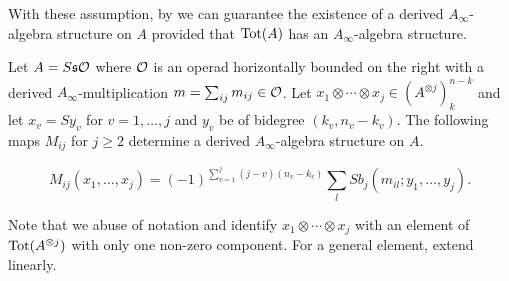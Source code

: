 \documentclass[twoside]{article}
\begin{document}
With these assumption, by  we can guarantee the existence of a derived $A_\infty$-algebra structure on $A$ provided that $\mathrm{Tot}(A)$ has an $A_\infty$-algebra structure.




\begin{thm}\label{derivedmaps}
Let $A=S\mathfrak{s}{\mathcal O}$ where ${\mathcal O}$ is an operad horizontally bounded on the right with a derived $A_\infty$-multiplication $m=\sum_{ij}m_{ij}\in{\mathcal O}$. Let $x_1\otimes\cdots\otimes x_j\in (A^{\otimes j})^{n-k}_k$ and let $x_v = Sy_v$ for $v=1,\dots, j$ and $y_v$ be of bidegree $(k_v,n_v-k_v)$. The following maps $M_{ij}$ for $j\geq 2$ determine a derived $A_\infty$-algebra structure on $A$.

\[M_{ij}(x_1,\dots,x_j)= (-1)^{\sum_{v=1}^j(j-v)(n_v-k_v)}\sum_lSb_j(m_{il};y_1,\dots, y_j). \]
\end{thm}
Note that we abuse of notation and identify $x_1\otimes\cdots\otimes x_j$ with an element of $\mathrm{Tot}(A^{\otimes j})$ with only one non-zero component. For a general element, extend linearly.
\end{document}
